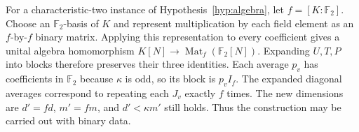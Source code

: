 \documentclass[11pt,a4paper]{article}
\numberwithin{equation}{section}
\DeclareMathOperator{\Mat}{Mat}
\begin{document}
\begin{remark}\label{rem:binary}
For a characteristic-two instance of Hypothesis~\ref{hyp:algebra},
let $f=[K:\mathbb F_2]$. Choose an $\mathbb F_2$-basis of $K$ and
represent multiplication by each field element as an $f$-by-$f$
binary matrix. Applying this representation to every coefficient
gives a unital algebra homomorphism
$K[N]\to\Mat_f(\mathbb F_2[N])$. Expanding $U,T,P$ into blocks
therefore preserves their three identities. Each average $p_v$
has coefficients in $\mathbb F_2$ because $\kappa$ is odd, so its
block is $p_v I_f$. The expanded diagonal averages correspond to
repeating each $J_v$ exactly $f$ times. The new dimensions are
$d'=fd$, $m'=fm$, and $d'<\kappa m'$ still holds.
Thus the construction may be carried out with binary data.
\end{remark}
\end{document}
